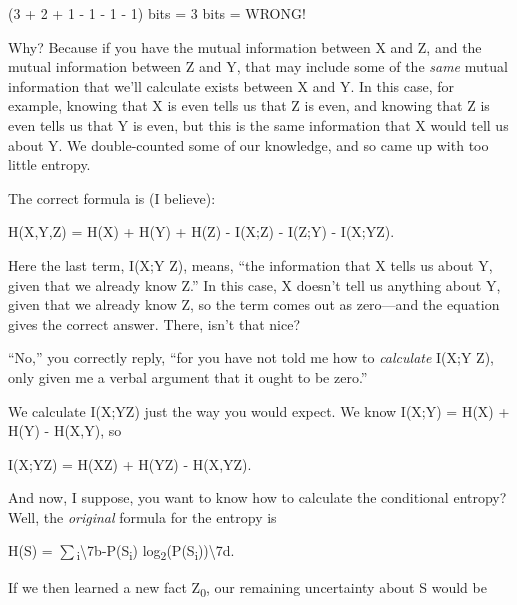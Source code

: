{\centering
 (3 + 2 + 1 - 1 - 1 - 1) bits = 3 bits = WRONG!
\par}


\bigskip

{
 Why? Because if you have the mutual information between X and Z,
and the mutual information between Z and Y, that may include some of
the \textit{same} mutual information that we'll
calculate exists between X and Y. In this case, for example, knowing
that X is even tells us that Z is even, and knowing that Z is even
tells us that Y is even, but this is the same information that X would
tell us about Y. We double-counted some of our knowledge, and so came
up with too little entropy. }

{
 The correct formula is (I believe):}

{\centering
 H(X,Y,Z) = H(X) + H(Y) + H(Z) - I(X;Z) - I(Z;Y) -
I(X;Y{\textbar}Z).
\par}


\bigskip

{
 Here the last term, I(X;Y {\textbar}Z), means,
``the information that X tells us about Y, given that
we already know Z.'' In this case, X
doesn't tell us anything about Y, given that we already
know Z, so the term comes out as zero---and the equation gives the
correct answer. There, isn't that nice? }

{
 ``No,'' you correctly reply,
``for you have not told me how to \textit{calculate}
I(X;Y {\textbar}Z), only given me a verbal argument that it ought to be
zero.''}

{
 We calculate I(X;Y{\textbar}Z) just the way you would expect. We
know I(X;Y) = H(X) + H(Y) - H(X,Y), so}

{\centering
 I(X;Y{\textbar}Z) = H(X{\textbar}Z) + H(Y{\textbar}Z) -
H(X,Y{\textbar}Z).
\par}


\bigskip

{
 And now, I suppose, you want to know how to calculate the
conditional entropy? Well, the \textit{original} formula for the
entropy is}

{\centering
 H(S) =
${\sum}$\textsubscript{i}{\textbackslash}{\textquotesingle}7b-P(S\textsubscript{i})
{\texttimes}
log\textsubscript{2}(P(S\textsubscript{i})){\textbackslash}{\textquotesingle}7d.
\par}


\bigskip

{
 If we then learned a new fact Z\textsubscript{0}, our remaining
uncertainty about S would be}

